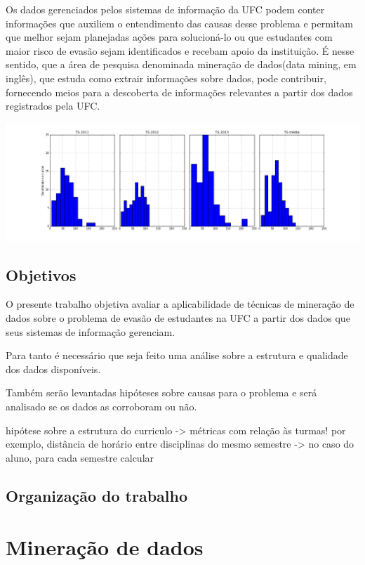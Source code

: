 \documentclass[a4paper]{article}
\begin{document}
Os dados gerenciados pelos sistemas de informação da UFC podem conter informações que auxiliem o entendimento das causas desse problema e permitam que melhor sejam planejadas ações para solucioná-lo ou que estudantes com maior risco de evasão sejam identificados e recebam apoio da instituição. É nesse sentido, que a área de pesquisa denominada mineração de dados(data mining, em inglês), que estuda como extrair informações sobre dados, pode contribuir, fornecendo meios para a descoberta de informações relevantes a partir dos dados registrados pela UFC.

\includegraphics[scale=0.4, trim=60mm 0mm 0mm 0mm]{taxa-de-sucesso-ufc-hist}



\subsection{Objetivos}
O presente trabalho objetiva avaliar a aplicabilidade de técnicas de mineração de dados sobre o problema de evasão de estudantes na UFC a partir dos dados que seus sistemas de informação gerenciam.  

Para tanto é necessário que seja feito uma análise sobre a estrutura e qualidade dos dados disponíveis.

Também serão levantadas hipóteses sobre causas para o problema e será analisado se os dados as corroboram ou não.

hipótese sobre a estrutura do curriculo -> métricas com relação às turmas! por exemplo, distância de horário entre disciplinas do mesmo semestre -> no caso do aluno, para cada semestre calcular

\subsection{Organização do trabalho}
\section{Mineração de dados}
\end{document}
